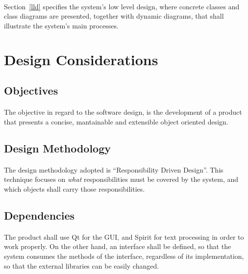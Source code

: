 \documentclass[a4paper,10pt]{article}
\begin{document}
\paragraph{}
Section~\ref{lld} specifies the system's low level design, where concrete classes and class diagrams are presented, together with dynamic diagrams, that shall illustrate the system's main processes.

\section{Design Considerations}
\label{considerations}

\subsection{Objectives}

\paragraph{}
The objective in regard to the software design, is the development of a product that presents a concise, mantainable and extensible object oriented design.

\subsection{Design Methodology}

\paragraph{}
The design methodology adopted is ``Responsibility Driven Design''. This technique focuses on \textit{what} responsibilities must be covered by the system, and which objects shall carry those responsibilities.


\subsection{Dependencies}

\paragraph{}
The product shall use Qt for the GUI, and Spirit for text processing in order to work properly. On the other hand, an interface shall be defined, so that the system consumes the methods of the interface, regardless of its implementation, so that the external libraries can be easily changed.
\end{document}

